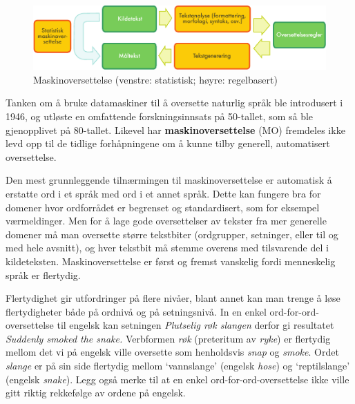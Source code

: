 \begin{multicols}{2}
\begin{figure}[htb]
  \center
  \includegraphics[width=\textwidth]{../_media/norwegian-bokmaal/machine_translation}
  \caption{Maskinoversettelse (venstre: statistisk; høyre: regelbasert)}
  \label{fig:mtarch_no}
\end{figure}

Tanken om å bruke datamaskiner til å oversette naturlig språk ble introdusert i 1946, og utløste en omfattende forskningsinnsats på 50-tallet, som så ble gjenopplivet på 80-tallet. Likevel har \textbf{maskinoversettelse} (MO) fremdeles ikke levd opp til de tidlige forhåpningene om å kunne tilby generell, automatisert oversettelse.


Den mest grunnleggende tilnærmingen til maskinoversettelse er automatisk å erstatte ord i et språk med ord i et annet språk. Dette kan fungere bra for domener hvor ordforrådet er begrenset og standardisert, som for eksempel værmeldinger. Men for å lage gode oversettelser av tekster fra mer generelle domener må man oversette større tekstbiter (ordgrupper, setninger, eller til og med hele avsnitt), og hver tekstbit må stemme overens med tilsvarende del i kildeteksten. Maskinoversettelse er først og fremst vanskelig fordi menneskelig språk er flertydig. 

Flertydighet gir utfordringer på flere nivåer, blant annet kan man trenge å løse flertydigheter både på ordnivå og på setningsnivå. 
In en enkel ord-for-ord-oversettelse til engelsk kan setningen \textit{Plutselig røk slangen} derfor gi resultatet \textit{Suddenly smoked the snake.}
Verbformen \textit{røk} (preteritum av \textit{ryke}) er flertydig mellom det vi på engelsk ville oversette som henholdsvis \textit{snap} og \textit{smoke}.
Ordet \textit{slange} er på sin side flertydig mellom `vannslange' (engelsk \textit{hose}) og `reptilslange' (engelsk \textit{snake}). Legg også merke til at en enkel ord-for-ord-oversettelse ikke ville gitt riktig rekkefølge av ordene på engelsk.


\end{multicols}
